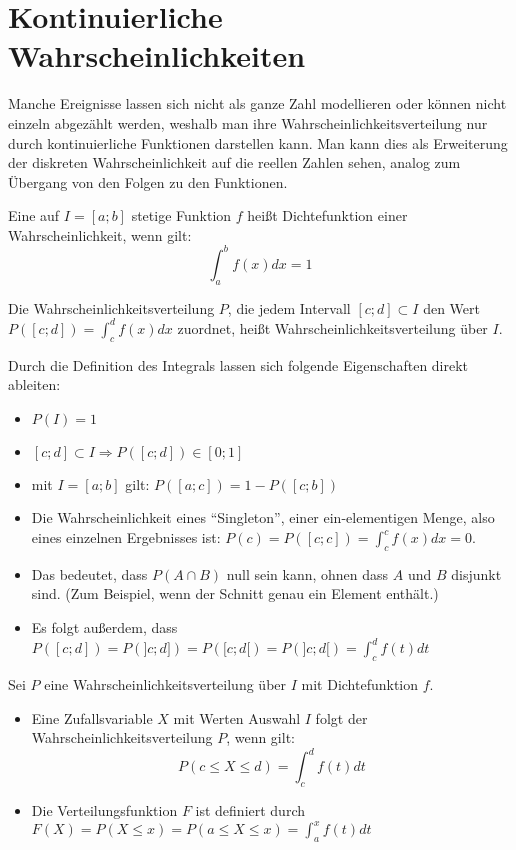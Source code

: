 \documentclass[main.tex]{subfiles}
\begin{document}
\section{Kontinuierliche Wahrscheinlichkeiten}
Manche Ereignisse lassen sich nicht als ganze Zahl modellieren oder können nicht einzeln abgezählt werden, weshalb man ihre Wahrscheinlichkeitsverteilung nur durch kontinuierliche Funktionen darstellen kann. Man kann dies als Erweiterung der diskreten Wahrscheinlichkeit auf die reellen Zahlen sehen, analog zum Übergang von den Folgen zu den Funktionen.
\begin{Definition}[Dichtefunktion]
  Eine auf $I = [a;b]$ stetige Funktion $f$ heißt Dichtefunktion einer Wahrscheinlichkeit, wenn gilt:
  $$\int_{a}^{b} f(x)dx =1$$
\end{Definition}
\begin{Definition}
  Die Wahrscheinlichkeitsverteilung $P$, die jedem Intervall $[c;d] \subset I$ den Wert $P([c;d]) = \displaystyle \int_c^d f(x)dx$ zuordnet, heißt Wahrscheinlichkeitsverteilung über $I$.
\end{Definition}
\begin{Bemerkung}
  Durch die Definition des Integrals lassen sich folgende Eigenschaften direkt ableiten:
  \begin{itemize}
    \item $P(I)=1$
    \item $[c;d] \subset I \Rightarrow P([c;d])\in [0;1]$
    \item mit $I = [a;b]$ gilt: $P([a;c]) = 1- P([c;b])$
    \item Die Wahrscheinlichkeit eines ``Singleton'', einer ein-elementigen Menge, also eines einzelnen Ergebnisses ist:
    $P({c})=P([c;c])=\displaystyle\int_c^c f(x)dx =0$.
    \item Das bedeutet, dass $P(A \cap B)$ null sein kann, ohnen dass $A$ und $B$ disjunkt sind. (Zum Beispiel, wenn der Schnitt genau ein Element enthält.)
    \item Es folgt außerdem, dass $P([c;d])=P(]c;d])=P([c;d[)=P(]c;d[)=\displaystyle\int_c^d f(t)dt$
  \end{itemize}
\end{Bemerkung}
\begin{Definition}
  Sei $P$ eine Wahrscheinlichkeitsverteilung über $I$ mit Dichtefunktion $f$.

  \begin{itemize}
    \item Eine Zufallsvariable $X$ mit Werten Auswahl $I$ folgt der Wahrscheinlichkeitsverteilung $P$, wenn gilt: $$P(c\leq X \leq d)=\displaystyle \int_c^d f(t)dt$$
    \item Die Verteilungsfunktion $F$ ist definiert durch $F(X)=P(X \leq x)=P(a \leq X \leq x)=\int_a^x f(t)dt$
  \end{itemize}
\end{Definition}
\end{document}
